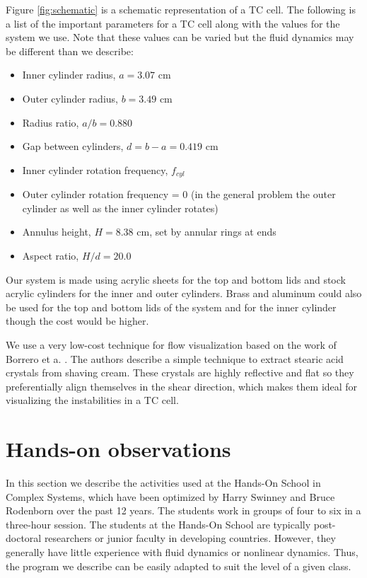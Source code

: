 \documentclass[%
 amsmath,amssymb,
 aps,
floatfix,
aps,prd,longbibliography,
notitlepage
]{revtex4-1}
\begin{document}
Figure \ref{fig:schematic} is a schematic representation of a TC cell. The following is a list of the important parameters for a TC cell along with the values for the system we use. Note that these values can be varied but the fluid dynamics may be different than we describe:
\begin{itemize}
\item Inner cylinder radius, $a = 3.07$ cm
\item Outer cylinder radius, $b = 3.49$ cm
\item Radius ratio, $a/b = 0.880 $
\item Gap between cylinders, $d = b-a = 0.419$ cm
\item Inner cylinder rotation frequency, $f_{cyl}$
\item Outer cylinder rotation frequency = 0  (in the general problem the outer cylinder as well as the inner cylinder rotates)
\item Annulus height, $H= 8.38$ cm, set by annular rings at ends
\item Aspect ratio, $H/d = 20.0$

\end{itemize}
Our system is made using acrylic sheets for the top and bottom lids and stock acrylic cylinders for the inner and outer cylinders. Brass and aluminum could also be used for the top and bottom lids of the system and for the inner cylinder though the cost would be higher.

We use a very low-cost technique for flow visualization based on the work of Borrero et a. \cite{borrero_2018}. The authors describe a simple technique to extract stearic acid crystals from shaving cream. These crystals are highly reflective and flat so they preferentially align themselves in the shear direction, which makes them ideal for visualizing the instabilities in a TC cell.

\section{Hands-on observations}
In this section we describe the activities used at the Hands-On School in Complex Systems, which have been optimized by Harry Swinney and Bruce Rodenborn over the past 12 years. The students work in groups of four to six in a three-hour session. The students at the Hands-On School are typically post-doctoral researchers or junior faculty in developing countries. However, they generally have little experience with fluid dynamics or nonlinear dynamics. Thus, the program we describe can be easily adapted to suit the level of a given class.
\end{document}
